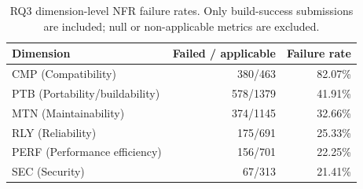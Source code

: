 \begin{table}[t]
\centering
\caption{RQ3 dimension-level NFR failure rates. Only build-success submissions are included; null or non-applicable metrics are excluded.}
\label{tab:rq3-dimension-failures}
\begin{tabular}{lrr}
\toprule
Dimension & Failed / applicable & Failure rate \\
\midrule
CMP (Compatibility) & 380/463 & 82.07\% \\
PTB (Portability/buildability) & 578/1379 & 41.91\% \\
MTN (Maintainability) & 374/1145 & 32.66\% \\
RLY (Reliability) & 175/691 & 25.33\% \\
PERF (Performance efficiency) & 156/701 & 22.25\% \\
SEC (Security) & 67/313 & 21.41\% \\
\bottomrule
\end{tabular}
\end{table}
